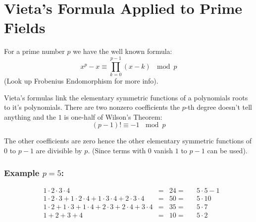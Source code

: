 
\section{Vieta's Formula Applied to Prime Fields}
For a prime number $p$ we have the well known formula:
\[x^p-x \equiv \prod_{k=0}^{p-1}(x-k)\,\mod p\]
(Look up Frobenius Endomorphism for more info).

Vieta's formulas link the elementary symmetric functions of a polynomials roots to it's polynomials.
There are two nonzero coefficients the $p$-th degree doesn't tell anything and the $1$ is one-half of Wilson's Theorem:
\[(p-1)! \equiv -1\,\mod p\]

The other coefficients are zero hence the other elementary symmetric functions of $0$ to $p-1$ are divisible by $p$.
(Since terms with $0$ vanish $1$ to $p-1$ can be used).

\subsubsection{Example $p=5$:}
\begin{equation*}
\begin{aligned}
	&1\cdot2\cdot3\cdot 4 &=& 24 =&&5\cdot5-1\\
	&1\cdot2\cdot3 + 1\cdot2\cdot4+1\cdot3\cdot4+2\cdot3\cdot4&=& 50 =&& 5\cdot 10\\
	&1\cdot2+1\cdot3+1\cdot4+2\cdot3+2\cdot4+3\cdot4 &=& 35 =&&5\cdot 7\\
	&1+2+3+4 &=& 10 =&&5\cdot 2\\
\end{aligned}
\end{equation*}
